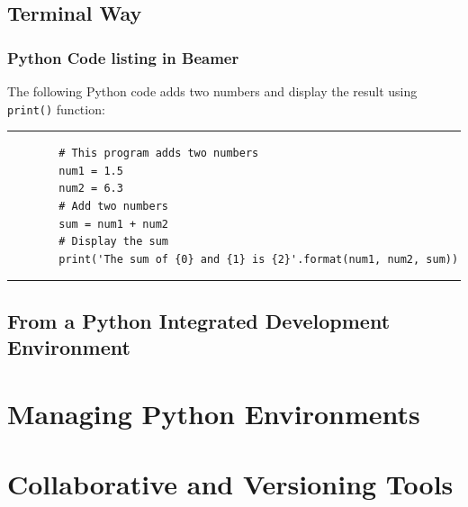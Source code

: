 \documentclass[aspectratio=1610]{beamer}
\begin{document}
\subsection{Terminal Way}

\begin{frame}[fragile]
	\frametitle{Python Code listing in Beamer}
	The following Python code adds two numbers and display the result using \verb|print()| function:
	\rule{\textwidth}{1pt}
	\scriptsize
	\begin{verbatim}
	    # This program adds two numbers
	    num1 = 1.5
	    num2 = 6.3
	    # Add two numbers
	    sum = num1 + num2
	    # Display the sum
	    print('The sum of {0} and {1} is {2}'.format(num1, num2, sum))
	\end{verbatim}
	\rule{\textwidth}{1pt}
	\end{frame}

\subsection{From a Python Integrated Development Environment}

\section{Managing Python Environments}


\section{Collaborative and Versioning Tools}
\end{document}
